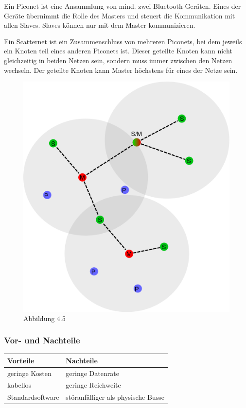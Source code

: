 Ein Piconet ist eine Ansammlung von mind. zwei Bluetooth-Geräten. Eines der Geräte übernimmt die Rolle des Masters und steuert die Kommunikation mit allen Slaves. Slaves können nur mit dem Master kommunizieren.

Ein Scatternet ist ein Zusammenschluss von mehreren Piconets, bei dem jeweils ein Knoten teil eines anderen Piconets ist. Dieser geteilte Knoten kann nicht gleichzeitig in beiden Netzen sein, sondern muss immer zwischen den Netzen wechseln. Der geteilte Knoten kann Master höchstens für eines der Netze sein.

\begin{figure}[h!]
	\includegraphics[width=0.7\linewidth]{pico-scatternet.png}
	\caption[https://de.wikipedia.org/wiki/Scatternet#/media/Datei:BluetoothScatternet-de.svg]{Abbildung 4.5}
\end{figure}

\subsubsection{Vor- und Nachteile}
\begin{tabular}{l|l}
	\textbf{Vorteile} & \textbf{Nachteile}\\
	\hline geringe Kosten & geringe Datenrate\\
	\hline kabellos & geringe Reichweite\\
	\hline Standardsoftware & störanfälliger als physische Busse\\
\end{tabular}